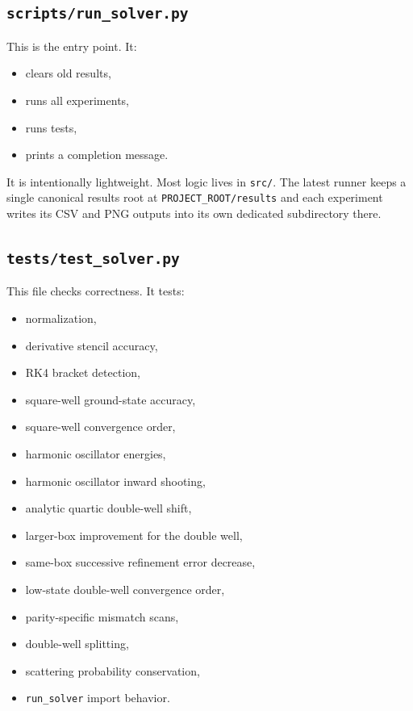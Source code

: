 \documentclass[11pt]{article}
\begin{document}
    \subsection{\texttt{scripts/run\_solver.py}}

    This is the entry point. It:
    \begin{itemize}
        \item clears old results,
        \item runs all experiments,
        \item runs tests,
        \item prints a completion message.
    \end{itemize}

    It is intentionally lightweight. Most logic lives in \texttt{src/}. The latest runner keeps a single canonical results root at \texttt{PROJECT\_ROOT/results} and each experiment writes its CSV and PNG outputs into its own dedicated subdirectory there.

    \subsection{\texttt{tests/test\_solver.py}}

    This file checks correctness. It tests:
    \begin{itemize}
        \item normalization,
        \item derivative stencil accuracy,
        \item RK4 bracket detection,
        \item square-well ground-state accuracy,
        \item square-well convergence order,
        \item harmonic oscillator energies,
        \item harmonic oscillator inward shooting,
        \item analytic quartic double-well shift,
        \item larger-box improvement for the double well,
        \item same-box successive refinement error decrease,
        \item low-state double-well convergence order,
        \item parity-specific mismatch scans,
        \item double-well splitting,
        \item scattering probability conservation,
        \item \texttt{run\_solver} import behavior.
    \end{itemize}
\end{document}
